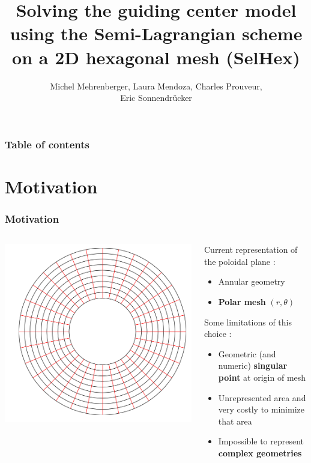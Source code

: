 \documentclass[]{beamer}
\title{Solving the guiding center model using the Semi-Lagrangian scheme on a 2D hexagonal mesh (SelHex)}
\author{Michel Mehrenberger, Laura Mendoza, Charles Prouveur,\\ Eric Sonnendr\"{u}cker}
\institute[SelHex (CEMRACS 2014)]
{
}\date{\displaydate{date}}
\begin{document}
\begin{frame}
\titlepage
\end{frame} 


\begin{frame}
\frametitle{Table of contents}
\tableofcontents
\end{frame} 


\section{Motivation} 


\begin{frame}
	\frametitle{Motivation}
	\begin{columns}
    	\begin{column}{0.45\textwidth}
    		\includegraphics[width=1.0\textwidth]{mapping.png}
    	\end{column}
    	\begin{column}{0.5\textwidth}
    		Current representation of the poloidal plane :
    		\begin{itemize}
    	    		\item Annular geometry
    			\item \textbf{Polar mesh} $(r, \theta)$
   		 \end{itemize}
   	 	Some limitations of this choice :
    		\begin{itemize}
    			\item{Geometric (and numeric)  \textbf{singular point} at origin of mesh}
    			\item{Unrepresented area and very costly to minimize that area}
    			\item{Impossible to represent \textbf{complex geometries} }
    		\end{itemize}
    	\end{column}
	\end{columns}
\end{frame}
\end{document}

